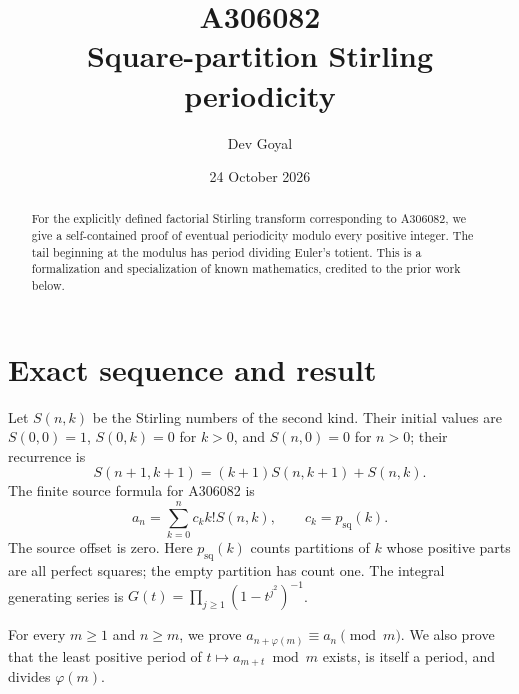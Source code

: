 \documentclass[11pt,a4paper]{article}
\title{A306082\\[3pt]Square-partition Stirling periodicity}
\author{Dev Goyal}
\date{24 October 2026}
\theoremstyle{remark}
\begin{document}
\maketitle
\begin{center}
\end{center}
\begin{abstract}
For the explicitly defined factorial Stirling transform corresponding to A306082, we give a self-contained proof of eventual periodicity modulo every positive integer. The tail beginning at the modulus has period dividing Euler's totient. This is a formalization and specialization of known mathematics, credited to the prior work below.
\end{abstract}
\section{Exact sequence and result}
Let $S(n,k)$ be the Stirling numbers of the second kind. Their initial
values are $S(0,0)=1$, $S(0,k)=0$ for $k>0$, and $S(n,0)=0$ for
$n>0$; their recurrence is
\[
S(n+1,k+1)=(k+1)S(n,k+1)+S(n,k).
\]
The finite source formula for A306082 \cite{oeis} is
\[
a_n=\sum_{k=0}^n c_k k!S(n,k),\qquad c_k=p_{\mathrm{sq}}(k).
\]
The source offset is zero. Here $p_{\mathrm{sq}}(k)$ counts partitions of $k$ whose positive parts are all perfect squares; the empty partition has count one. The integral generating series is $G(t)=\prod_{j\ge1}(1-t^{j^2})^{-1}$.

For every $m\ge1$ and $n\ge m$, we prove
$a_{n+\varphi(m)}\equiv a_n\pmod m$. We also prove that the least
positive period of $t\mapsto a_{m+t}\bmod m$ exists, is itself a
period, and divides $\varphi(m)$.
\end{document}
